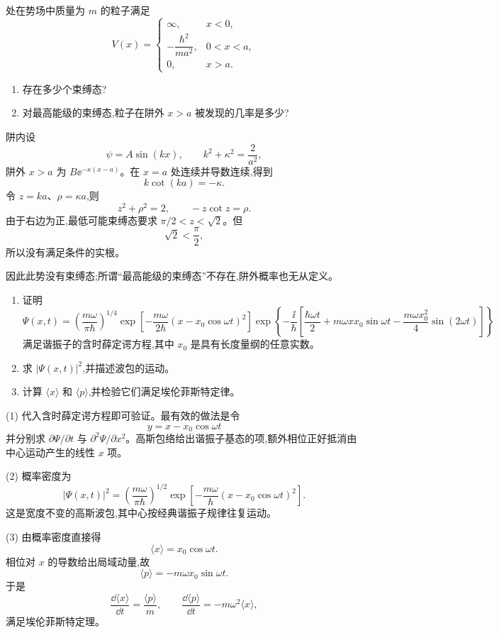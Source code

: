 \begin{question}
处在势场中质量为 $m$ 的粒子满足
\[
V(x)=\begin{cases}\infty,&x<0,\\ -\dfrac{\hbar^2}{ma^2},&0<x<a,\\0,&x>a.
\end{cases}
\]
\begin{enumerate}
\item 存在多少个束缚态?
\item 对最高能级的束缚态,粒子在阱外 $x>a$ 被发现的几率是多少?
\end{enumerate}
\begin{solution}
阱内设
\[
\psi=A\sin(kx),
\qquad
k^2+\kappa^2=\frac{2}{a^2},
\]
阱外 $x>a$ 为 $B\ee^{-\kappa(x-a)}$。在 $x=a$ 处连续并导数连续,得到
\[
k\cot(ka)=-\kappa.
\]
令 $z=ka$、$\rho=\kappa a$,则
\[
z^2+\rho^2=2,
\qquad
-z\cot z=\rho.
\]
由于右边为正,最低可能束缚态要求 $\pi/2<z<\sqrt2$。但
\[
\sqrt2<\frac\pi2,
\]
所以没有满足条件的实根。

因此此势没有束缚态;所谓“最高能级的束缚态”不存在,阱外概率也无从定义。
\end{solution}
\end{question}

\begin{question}
\begin{enumerate}
\item 证明
\[
\Psi(x,t)=\left(\frac{m\omega}{\pi\hbar}\right)^{1/4}
\exp\!\left[-\frac{m\omega}{2\hbar}(x-x_0\cos\omega t)^2\right]
\exp\!\left\{-\frac{\ii}{\hbar}\left[\frac{\hbar\omega t}{2}+m\omega x x_0\sin\omega t-\frac{m\omega x_0^2}{4}\sin(2\omega t)\right]\right\}
\]
满足谐振子的含时薛定谔方程,其中 $x_0$ 是具有长度量纲的任意实数。
\item 求 $|\Psi(x,t)|^2$,并描述波包的运动。
\item 计算 $\langle x\rangle$ 和 $\langle p\rangle$,并检验它们满足埃伦菲斯特定律。
\end{enumerate}
\begin{solution}
(1) 代入含时薛定谔方程即可验证。最有效的做法是令
\[
y=x-x_0\cos\omega t
\]
并分别求 $\partial\Psi/\partial t$ 与 $\partial^2\Psi/\partial x^2$。高斯包络给出谐振子基态的项,额外相位正好抵消由中心运动产生的线性 $x$ 项。

(2) 概率密度为
\[
|\Psi(x,t)|^2=\left(\frac{m\omega}{\pi\hbar}\right)^{1/2}
\exp\left[-\frac{m\omega}{\hbar}(x-x_0\cos\omega t)^2\right].
\]
这是宽度不变的高斯波包,其中心按经典谐振子规律往复运动。

(3) 由概率密度直接得
\[
\langle x\rangle=x_0\cos\omega t.
\]
相位对 $x$ 的导数给出局域动量,故
\[
\langle p\rangle=-m\omega x_0\sin\omega t.
\]
于是
\[
\frac{\dd\langle x\rangle}{\dd t}=\frac{\langle p\rangle}{m},
\qquad
\frac{\dd\langle p\rangle}{\dd t}=-m\omega^2\langle x\rangle,
\]
满足埃伦菲斯特定理。
\end{solution}
\end{question}

